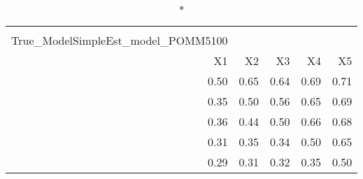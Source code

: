 \begin{longtable}{rrrrr}
\caption*{
{\large Pestmatrix} \\ 
{\small True\_ModelSimpleEst\_model\_POMM5100}
} \\ 
\toprule
X1 & X2 & X3 & X4 & X5 \\ 
\midrule
0.50 & 0.65 & 0.64 & 0.69 & 0.71 \\ 
0.35 & 0.50 & 0.56 & 0.65 & 0.69 \\ 
0.36 & 0.44 & 0.50 & 0.66 & 0.68 \\ 
0.31 & 0.35 & 0.34 & 0.50 & 0.65 \\ 
0.29 & 0.31 & 0.32 & 0.35 & 0.50 \\ 
\bottomrule
\end{longtable}

